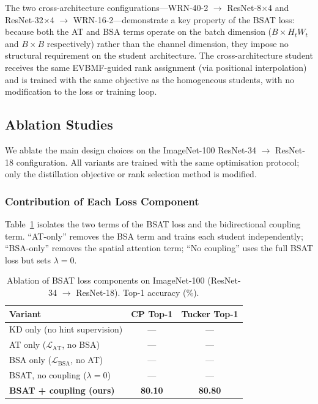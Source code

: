 \documentclass[conference]{IEEEtran}
\begin{document}
The two cross-architecture configurations—WRN-40-2 $\to$ ResNet-8$\times$4
and ResNet-32$\times$4 $\to$ WRN-16-2—demonstrate a key property of the
BSAT loss: because both the AT and BSA terms operate on the batch dimension
($B \times H_tW_t$ and $B \times B$ respectively) rather than the channel
dimension, they impose no structural requirement on the student architecture.
The cross-architecture student receives the same EVBMF-guided rank assignment
(via positional interpolation) and is trained with the same objective as the
homogeneous students, with no modification to the loss or training loop.

\subsection{Ablation Studies}
\label{sec:ablation}

We ablate the main design choices on the ImageNet-100 ResNet-34 $\to$
ResNet-18 configuration. All variants are trained with the same optimisation
protocol; only the distillation objective or rank selection method is
modified.

\subsubsection{Contribution of Each Loss Component}

Table~\ref{tab:ablation_loss} isolates the two terms of the BSAT loss and the
bidirectional coupling term. ``AT-only'' removes the BSA term and trains each
student independently; ``BSA-only'' removes the spatial attention term;
``No coupling'' uses the full BSAT loss but sets $\lambda = 0$.

\begin{table}[t]
  \centering
  \caption{Ablation of BSAT loss components on ImageNet-100
    (ResNet-34 $\to$ ResNet-18). Top-1 accuracy (\%).}
  \label{tab:ablation_loss}
  \begin{tabular}{lcc}
    \toprule
    \textbf{Variant} & \textbf{CP Top-1} & \textbf{Tucker Top-1} \\
    \midrule
    KD only (no hint supervision)         & — & — \\
    AT only ($\mathcal{L}_{\mathrm{AT}}$, no BSA)  & — & — \\
    BSA only ($\mathcal{L}_{\mathrm{BSA}}$, no AT) & — & — \\
    BSAT, no coupling ($\lambda=0$)        & — & — \\
    \textbf{BSAT + coupling (ours)}        & \textbf{80.10} & \textbf{80.80} \\
    \bottomrule
  \end{tabular}
\end{table}
\end{document}
